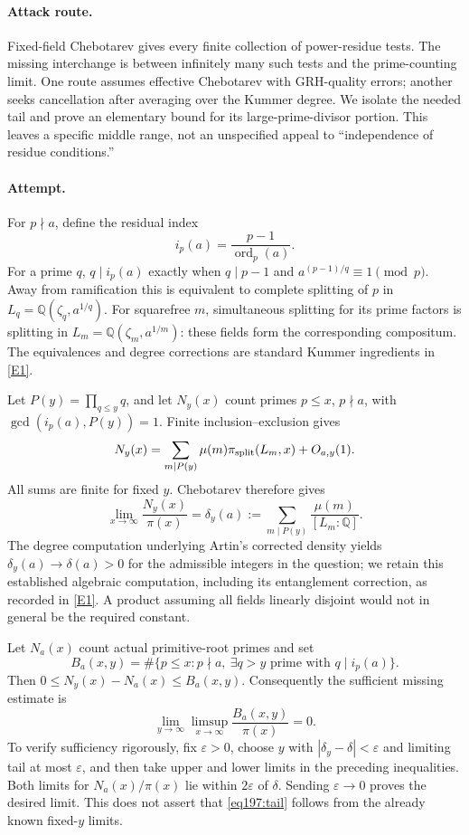\documentclass[11pt,a4paper]{article}
\newcommand{\Q}{\mathbb{Q}}
\newcommand{\eref}[2]{\hyperlink{extra:#1:#2}{[E#2]}}
\numberwithin{equation}{section}
\begin{document}
\paragraph{Attack route.}
Fixed-field Chebotarev gives every finite collection of power-residue tests. The missing interchange is between infinitely many such tests and the prime-counting limit. One route assumes effective Chebotarev with GRH-quality errors; another seeks cancellation after averaging over the Kummer degree. We isolate the needed tail and prove an elementary bound for its large-prime-divisor portion. This leaves a specific middle range, not an unspecified appeal to ``independence of residue conditions.''

\paragraph{Attempt.}
For $p\nmid a$, define the residual index
\[
 i_p(a)=\frac{p-1}{\operatorname{ord}_p(a)}.
\]
For a prime $q$, $q\mid i_p(a)$ exactly when $q\mid p-1$ and $a^{(p-1)/q}\equiv1\pmod p$. Away from ramification this is equivalent to complete splitting of $p$ in
$L_q=\Q(\zeta_q,a^{1/q})$. For squarefree $m$, simultaneous splitting for its prime factors is splitting in $L_m=\Q(\zeta_m,a^{1/m})$: these fields form the corresponding compositum. The equivalences and degree corrections are standard Kummer ingredients in \eref{1183}{1}.

Let $P(y)=\prod_{q\le y}q$, and let $N_y(x)$ count primes $p\le x$, $p\nmid a$, with $\gcd(i_p(a),P(y))=1$. Finite inclusion--exclusion gives
\begin{equation}\label{eq197:finite}
 N_y(x)=\sum_{m\mid P(y)}\mu(m)\pi_{\rm split}(L_m,x)+O_{a,y}(1).
\end{equation}
All sums are finite for fixed $y$. Chebotarev therefore gives
\[
 \lim_{x\to\infty}\frac{N_y(x)}{\pi(x)}
 =\delta_y(a):=\sum_{m\mid P(y)}\frac{\mu(m)}{[L_m:\Q]}.
\]
The degree computation underlying Artin's corrected density yields
$\delta_y(a)\to\delta(a)>0$ for the admissible integers in the question; we retain this established algebraic computation, including its entanglement correction, as recorded in \eref{1183}{1}. A product assuming all fields linearly disjoint would not in general be the required constant.

Let $N_a(x)$ count actual primitive-root primes and set
\[
 B_a(x,y)=\#\{p\le x:p\nmid a,\ \exists q>y\text{ prime with }q\mid i_p(a)\}.
\]
Then $0\le N_y(x)-N_a(x)\le B_a(x,y)$. Consequently the sufficient missing estimate is
\begin{equation}\label{eq197:tail}
 \lim_{y\to\infty}\limsup_{x\to\infty}
       \frac{B_a(x,y)}{\pi(x)}=0.
\end{equation}
To verify sufficiency rigorously, fix $\varepsilon>0$, choose $y$ with $|\delta_y-\delta|<\varepsilon$ and limiting tail at most $\varepsilon$, and then take upper and lower limits in the preceding inequalities. Both limits for $N_a(x)/\pi(x)$ lie within $2\varepsilon$ of $\delta$. Sending $\varepsilon\to0$ proves the desired limit. This does not assert that \eqref{eq197:tail} follows from the already known fixed-$y$ limits.
\end{document}
